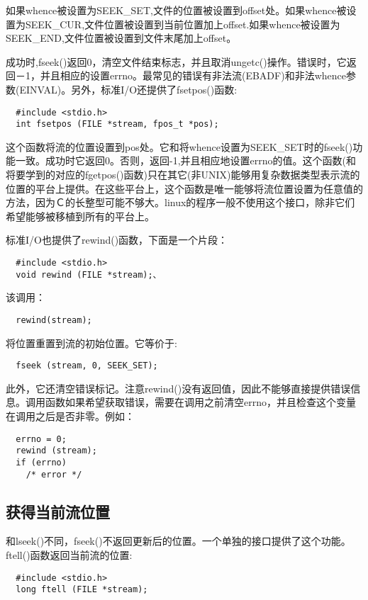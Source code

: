 如果whence被设置为SEEK\_SET,文件的位置被设置到offset处。如果whence被设置为SEEK\_CUR,文件位置被设置到当前位置加上offset.如果whence被设置为SEEK\_END,文件位置被设置到文件末尾加上offset。

成功时,fseek()返回0，清空文件结束标志，并且取消ungetc()操作。错误时，它返回－1，并且相应的设置errno。最常见的错误有非法流(EBADF)和非法whence参数(EINVAL)。另外，标准I/O还提供了fsetpos()函数:
\begin{lstlisting}
  #include <stdio.h>
  int fsetpos (FILE *stream, fpos_t *pos);
\end{lstlisting}

这个函数将流的位置设置到pos处。它和将whence设置为SEEK\_SET时的fseek()功能一致。成功时它返回0。否则，返回-1,并且相应地设置errno的值。这个函数(和将要学到的对应的fgetpos()函数)只在其它(非UNIX)能够用复杂数据类型表示流的位置的平台上提供。在这些平台上，这个函数是唯一能够将流位置设置为任意值的方法，因为Ｃ的长整型可能不够大。linux的程序一般不使用这个接口，除非它们希望能够被移植到所有的平台上。

标准I/O也提供了rewind()函数，下面是一个片段：
\begin{lstlisting}
  #include <stdio.h>
  void rewind (FILE *stream);、
\end{lstlisting}

该调用：
\begin{lstlisting}
  rewind(stream);
\end{lstlisting}

将位置重置到流的初始位置。它等价于:
\begin{lstlisting}
  fseek (stream, 0, SEEK_SET);
\end{lstlisting}

此外，它还清空错误标记。注意rewind()没有返回值，因此不能够直接提供错误信息。调用函数如果希望获取错误，需要在调用之前清空errno，并且检查这个变量在调用之后是否非零。例如：
\begin{lstlisting}
  errno = 0;
  rewind (stream);
  if (errno)
    /* error */
\end{lstlisting}


\subsection{获得当前流位置}

和lseek()不同，fseek()不返回更新后的位置。一个单独的接口提供了这个功能。ftell()函数返回当前流的位置:
\begin{lstlisting}
  #include <stdio.h>
  long ftell (FILE *stream);
\end{lstlisting}

